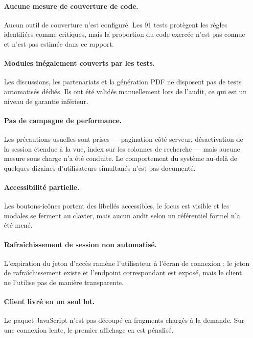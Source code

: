 \paragraph{Aucune mesure de couverture de code.} Aucun outil de couverture n'est configuré.
Les 91 tests protègent les règles identifiées comme critiques, mais la proportion du code
exercée n'est pas connue et n'est pas estimée dans ce rapport.

\paragraph{Modules inégalement couverts par les tests.} Les discussions, les partenariats et
la génération PDF ne disposent pas de tests automatisés dédiés. Ils ont été validés
manuellement lors de l'audit, ce qui est un niveau de garantie inférieur.

\paragraph{Pas de campagne de performance.} Les précautions usuelles sont prises ---
pagination côté serveur, désactivation de la session étendue à la vue, index sur les
colonnes de recherche --- mais aucune mesure sous charge n'a été conduite. Le comportement
du système au-delà de quelques dizaines d'utilisateurs simultanés n'est pas documenté.

\paragraph{Accessibilité partielle.} Les boutons-icônes portent des libellés accessibles, le
focus est visible et les modales se ferment au clavier, mais aucun audit selon un référentiel
formel n'a été mené.

\paragraph{Rafraîchissement de session non automatisé.} L'expiration du jeton d'accès ramène
l'utilisateur à l'écran de connexion ; le jeton de rafraîchissement existe et l'endpoint
correspondant est exposé, mais le client ne l'utilise pas de manière transparente.

\paragraph{Client livré en un seul lot.} Le paquet JavaScript n'est pas découpé en fragments
chargés à la demande. Sur une connexion lente, le premier affichage en est pénalisé.

